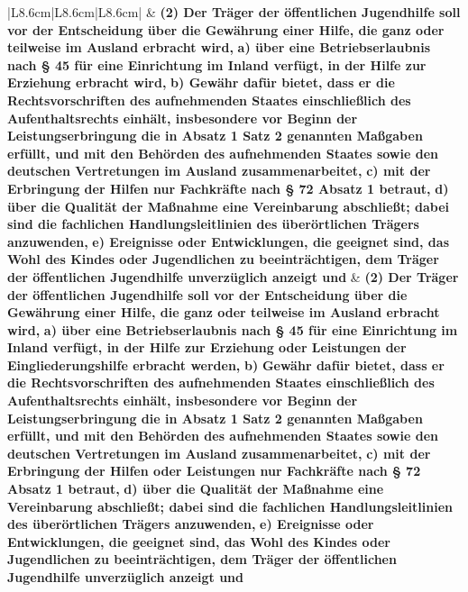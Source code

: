 \documentclass[10pt,a4paper,landscape]{article}
\begin{document}
\begin{longtable}{|L{8.6cm}|L{8.6cm}|L{8.6cm}|}
\hline
 & \textbf{(2) Der Träger der öffentlichen Jugendhilfe soll vor der Entscheidung über die Gewährung einer Hilfe, die ganz oder teilweise im Ausland erbracht wird, } \newline \textbf{a) über eine Betriebserlaubnis nach \S{} 45 für eine Einrichtung im Inland verfügt, in der Hilfe zur Erziehung erbracht wird, } \newline \textbf{b) Gewähr dafür bietet, dass er die Rechtsvorschriften des aufnehmenden Staates einschließlich des Aufenthaltsrechts einhält, insbesondere vor Beginn der Leistungserbringung die in Absatz 1 Satz 2 genannten Maßgaben erfüllt, und mit den Behörden des aufnehmenden Staates sowie den deutschen Vertretungen im Ausland zusammenarbeitet, } \newline \textbf{c) mit der Erbringung der Hilfen nur Fachkräfte nach \S{} 72 Absatz 1 betraut, } \newline \textbf{d) über die Qualität der Maßnahme eine Vereinbarung abschließt; dabei sind die fachlichen Handlungsleitlinien des überörtlichen Trägers anzuwenden, } \newline \textbf{e) Ereignisse oder Entwicklungen, die geeignet sind, das Wohl des Kindes oder Jugendlichen zu beeinträchtigen, dem Träger der öffentlichen Jugendhilfe unverzüglich anzeigt und } & \textbf{(2) Der Träger der öffentlichen Jugendhilfe soll vor der Entscheidung über die Gewährung einer Hilfe, die ganz oder teilweise im Ausland erbracht wird, } \newline \textbf{a) über eine Betriebserlaubnis nach \S{} 45 für eine Einrichtung im Inland verfügt, in der Hilfe zur Erziehung oder Leistungen der Eingliederungshilfe erbracht werden, } \newline \textbf{b) }\textbf{Gewähr dafür bietet, dass er die Rechtsvorschriften des aufnehmenden Staates einschließlich des Aufenthaltsrechts einhält, insbesondere vor Beginn der Leistungserbringung die in Absatz 1 Satz 2 genannten Maßgaben erfüllt, und mit den Behörden des aufnehmenden Staates sowie den deutschen Vertretungen im Ausland zusammenarbeitet, } \newline \textbf{c) mit der Erbringung der Hilfen oder Leistungen nur Fachkräfte nach \S{} 72 Absatz 1 betraut, } \newline \textbf{d) über die Qualität der Maßnahme eine Vereinbarung abschließt; dabei sind die fachlichen Handlungsleitlinien des überörtlichen Trägers anzuwenden, } \newline \textbf{e) Ereignisse oder Entwicklungen, die geeignet sind, das Wohl des Kindes oder Jugendlichen zu beeinträchtigen, dem Träger der öffentlichen Jugendhilfe unverzüglich anzeigt und } \\

\end{longtable}
\end{document}
